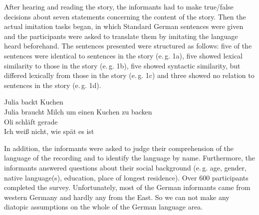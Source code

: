 \documentclass[output=paper]{LSP/langsci}
\begin{document}
After hearing and reading the story, the informants had to make true/false decisions about seven statements concerning the content of the story. Then the actual imitation tasks began, in which Standard German sentences were given and the participants were asked to translate them by imitating the language heard beforehand. The sentences presented were structured as follows: five of the sentences were identical to sentences in the story (e.\,g. 1a), five showed lexical similarity to those in the story (e.\,g. 1b), five showed syntactic similarity, but differed lexically from those in the story  (e.\,g. 1c) and three showed no relation to sentences in the story (e.\,g. 1d).

\eal
\ex Julia backt Kuchen
  \label{bsp1}\\
\ex Julia braucht Milch um einen Kuchen zu backen 
  \label{bsp2}\\
\ex Oli schl\"aft gerade
  \label{bsp3}\\
\ex Ich weiß nicht, wie sp\"at es ist  \label{bsp4}\\
\zl

In addition, the informants were asked to judge their comprehension of the language of the recording and to identify the language by name. Furthermore,  the informants answered questions about their social background (e.\,g. age, gender, native language(s), education, place of longest residence). Over 600 participants completed the survey. Unfortunately, most of the German informants came from western Germany and hardly any from the East. So we can not make any dia\-topic assumptions on the whole of the German language area.
\end{document}
